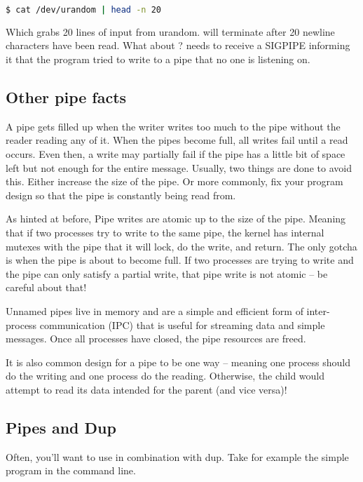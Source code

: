 \begin{lstlisting}[language=bash]
	$ cat /dev/urandom | head -n 20
\end{lstlisting}
Which grabs 20 lines of input from urandom.  will terminate after 20 newline characters have been read.
What about ?
 needs to receive a SIGPIPE informing it that the program tried to write to a pipe that no one is listening on.
	 
\subsection{Other pipe facts}
	 
A pipe gets filled up when the writer writes too much to the pipe without the reader reading any of it. When the pipes become full, all writes fail until a read occurs. Even then, a write may partially fail if the pipe has a little bit of space left but not enough for the entire message. Usually, two things are done to avoid this. Either increase the size of the pipe. Or more commonly, fix your program design so that the pipe is constantly being read from.
	 
As hinted at before, Pipe writes are atomic up to the size of the pipe. Meaning that if two processes try to write to the same pipe, the kernel has internal mutexes with the pipe that it will lock, do the write, and return. The only gotcha is when the pipe is about to become full. If two processes are trying to write and the pipe can only satisfy a partial write, that pipe write is not atomic -- be careful about that!
	 
Unnamed pipes live in memory and are a simple and efficient form of inter-process communication (IPC) that is useful for streaming data and simple messages. Once all processes have closed, the pipe resources are freed.
	 
It is also common design for a pipe to be one way -- meaning one process should do the writing and one process do the reading. Otherwise, the child would attempt to read its data intended for the parent (and vice versa)!
	 
\subsection{Pipes and Dup}
	 
Often, you'll want to use  in combination with dup.
Take for example the simple program in the command line.
	 
